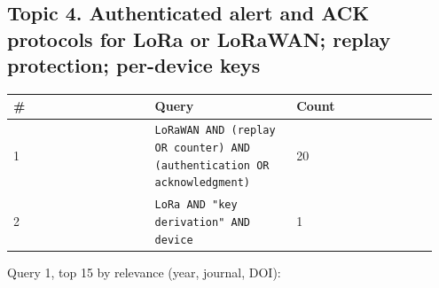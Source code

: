 \subsection*{Topic 4. Authenticated alert and ACK protocols for LoRa or LoRaWAN; replay protection; per-device keys}

{\scriptsize\raggedright
\begin{longtable}{p{0.317\linewidth}p{0.317\linewidth}p{0.317\linewidth}}
\toprule
\# & Query & Count \\
\midrule
\endhead
1 & \texttt{LoRaWAN AND (replay OR counter) AND (authentication OR acknowledgment)} & 20 \\
2 & \texttt{LoRa AND "key derivation" AND device} & 1 \\
\bottomrule
\end{longtable}}

Query 1, top 15 by relevance (year, journal, DOI):


